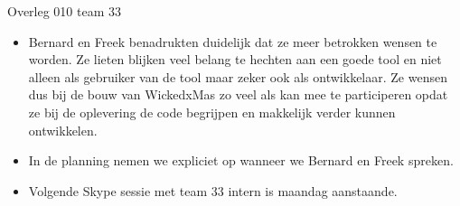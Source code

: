 \documentclass{article}
\begin{document}
\begin{Minutes}{Overleg 010 team 33}

\begin{itemize}
\item Bernard en Freek benadrukten duidelijk dat ze meer betrokken wensen te worden.
Ze lieten blijken veel belang te hechten aan een goede tool en niet alleen
als gebruiker van de tool maar zeker ook als ontwikkelaar. Ze wensen dus bij de
bouw van WickedxMas zo veel als kan mee te participeren opdat ze bij de
oplevering de code begrijpen en makkelijk verder kunnen ontwikkelen.
\item In de planning nemen we expliciet op wanneer we Bernard en Freek spreken.
\item Volgende Skype sessie met team 33 intern is maandag aanstaande.
\end{itemize}

\end{Minutes}
\end{document}
